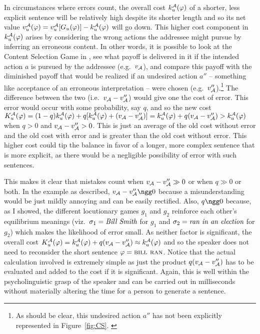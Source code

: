 In circumstances where errors count, the overall cost $k^{\cal A}_u(\varphi)$ of a shorter, less explicit sentence will be relatively high despite its shorter length and so its net value $v_u^{\cal A}(\varphi) = v_u^{\cal A}[G_u(\varphi)] - k^{\cal A}_u(\varphi)$ will go down. This higher cost component in $k^{\cal A}_u(\varphi)$ arises by considering the wrong actions the addressee might pursue by inferring an erroneous content. In other words, it is possible to look at the Content Selection Game in , see what payoff is delivered in it if the intended action $a$ is pursued by the addressee (e.g.\ $v_{\cal A}$), and compare this payoff with the diminished payoff that would be realized if an undesired action $a''$ -- something like acceptance of an erroneous interpretation -- were chosen (e.g.\ $v''_{\cal A}$).\footnote{As should be clear, this undesired action $a''$ has not been explicitly represented in Figure~\ref{fig:CS}. \label{foot:a''}} The difference between the two (i.e.\ $v_{\cal A} - v''_{\cal A}$) would give one the cost of error. This error would occur with some probability, say $q$, and so the new cost $K^{\cal A}_u(\varphi) = (1 - q)k^{\cal A}_u(\varphi) + q[k^{\cal A}_u(\varphi) + (v_{\cal A} - v''_{\cal A})] = k^{\cal A}_u(\varphi) + q(v_{\cal A} - v''_{\cal A}) > k^{\cal A}_u(\varphi)$ when $q > 0$ and $v_{\cal A} - v''_{\cal A} > 0$. This is just an average of the old cost without error and the old cost with error and is greater than the old cost without error. This higher cost could tip the balance in favor of a longer, more complex sentence that is more explicit, as there would be a negligible possibility of error with such sentences.

This makes it clear that mistakes count when $v_{\cal A} - v''_{\cal A} \gg 0$ or when $q \gg 0$ or both. In the example as described, $v_{\cal A} - v''_{\cal A} \ngg 0$ because a misunderstanding would be just mildly annoying and can be easily rectified. Also, $q \ngg 0$ because, as I showed, the different locutionary games $g_1$ and $g_2$ reinforce each other's equilibrium meanings (viz.\ $\sigma_1 = \emph{Bill Smith}$ for $g_1$ and $\sigma_2 = \emph{ran in an election}$ for $g_2$) which makes the likelihood of error small. As neither factor is significant, the overall cost $K^{\cal A}_u(\varphi) = k^{\cal A}_u(\varphi) + q(v_{\cal A} - v''_{\cal A}) \approx k^{\cal A}_u(\varphi)$ and so the speaker does not need to reconsider the short sentence $\varphi = \Expression{bill ran}$. Notice that the actual calculation involved is extremely simple as just the product $q(v_{\cal A} - v''_{\cal A})$ has to be evaluated and added to the cost if it is significant. Again, this is well within the psycholinguistic grasp of the speaker and can be carried out in milliseconds without materially altering the time for a person to generate a sentence.

